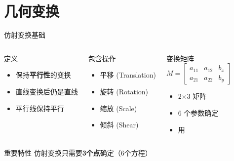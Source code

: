 
\section{几何变换}

\begin{frame}{仿射变换基础}
    \begin{columns}
        \begin{block}{定义}
            \begin{itemize}
                \item 保持\textbf{平行性}的变换
                \item 直线变换后仍是直线
                \item 平行线保持平行
            \end{itemize}
        \end{block}

        \begin{block}{包含操作}
            \begin{itemize}
                \item 平移 (Translation)
                \item 旋转 (Rotation)
                \item 缩放 (Scale)
                \item 倾斜 (Shear)
            \end{itemize}
        \end{block}

        \begin{block}{变换矩阵}
            $$M = \begin{bmatrix}
            a_{11} & a_{12} & b_x \\
            a_{21} & a_{22} & b_y
            \end{bmatrix}$$

            \begin{itemize}
                \item 2×3 矩阵
                \item 6 个参数确定
                \item 用 
            \end{itemize}
        \end{block}
    \end{columns}

    \begin{alertblock}{重要特性}
        仿射变换只需要\textbf{3个点}确定（6个方程）
    \end{alertblock}
\end{frame}

